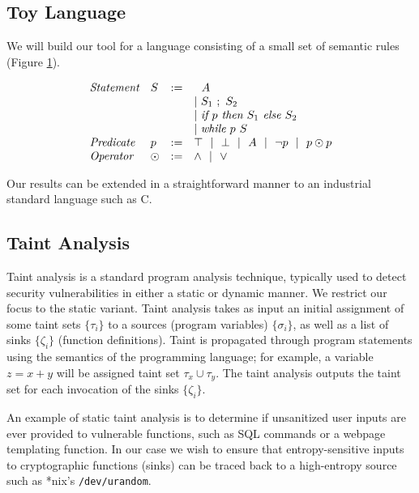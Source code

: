 \documentclass[letterpaper,twocolumn,10pt]{article}
\begin{document}
\subsection{Toy Language}

We will build our tool for a language consisting of a small set of semantic rules (Figure \ref{fig:semrules}).

\begin{figure}
\label{fig:semrules}
\caption{}
\[
	\begin{array}{l l c l}
		\emph{Statement} & S & := & 
			\ \ A \\
			& & & |~ S_1\ ;\ S_2 \\
			& & & |~ \emph{if }p\emph{ then } S_1 \emph{ else } S_2 \\
			& & & |~ \emph{while }p\emph{ } S \\
		\emph{Predicate} & p &:=& \top ~~|~~ \bot ~~|~~ A ~~|~~ \lnot p ~~|~~ p \odot p \\
		\emph{Operator} & \odot &:=& \land ~~|~~ \lor \\
	\end{array}
\]
\end{figure}

Our results can be extended in a straightforward manner to an industrial standard language such as C.

\subsection{Taint Analysis}

Taint analysis is a standard program analysis technique, typically used to detect security vulnerabilities in either a static or dynamic manner. 
We restrict our focus to the static variant. Taint analysis takes as input an initial assignment of some taint sets $\{\tau_i\}$ to 
a sources (program variables) $\{\sigma_i\}$, as well as a list of sinks $\{\zeta_i\}$ (function definitions). 
Taint is propagated through program statements using the semantics of the programming language;
for example, a variable $z = x + y$ will be assigned taint set $\tau_x \cup \tau_y$. The taint analysis outputs the taint set for each invocation
of the sinks $\{\zeta_i\}$.

An example of static taint analysis is to determine if unsanitized user inputs are ever provided to vulnerable functions, such as SQL commands or
a webpage templating function. In our case we wish to ensure that entropy-sensitive inputs to cryptographic functions (sinks) can be
traced back to a high-entropy source such as *nix's \texttt{/dev/urandom}.
\end{document}

